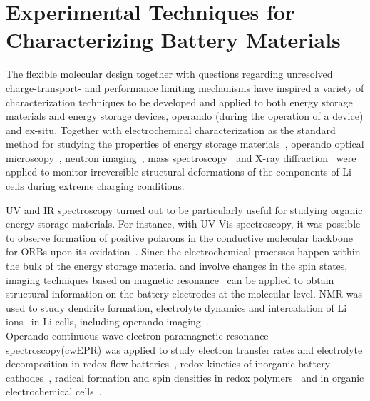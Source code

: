 \section{Experimental Techniques for Characterizing Battery Materials}
The flexible molecular design together with questions regarding unresolved charge-transport- and performance limiting mechanisms have inspired a variety of characterization techniques to be developed and applied to both energy storage materials and energy storage devices, operando (during the operation of a device) and ex-situ. Together with electrochemical characterization as the standard method for studying the properties of energy storage materials~\cite{Bard_book,IWASA2007,Zens2022}, operando optical microscopy~\cite{Merryweather2022}, neutron imaging~\cite{Ma2020}, mass spectroscopy~\cite{Fang_2021} and X-ray diffraction~\cite{Rhodes2012} were applied to monitor irreversible structural deformations of the components of Li cells during extreme charging conditions.\\

\par UV and IR spectroscopy turned out to be particularly useful for studying organic energy-storage materials. For instance, with UV-Vis spectroscopy, it was possible to observe formation of positive polarons in the conductive molecular backbone for ORBs upon its oxidation~\cite{Dmitrieva2018}.
Since the electrochemical processes happen within the bulk of the energy storage material and involve changes in the spin states, imaging techniques based on magnetic resonance~\cite{Niemoller2018,Meier2013,Li2019,Bittl2005} can be applied to obtain structural information on the battery electrodes at the molecular level. NMR was used to study dendrite formation, electrolyte dynamics and intercalation of Li ions~\cite{Kushida1980,Grosu2023a} in Li cells, including operando imaging~\cite{Shi2019}.\\ 

Operando continuous-wave electron paramagnetic resonance spectroscopy(cwEPR) was applied to study electron transfer rates and electrolyte decomposition in redox-flow batteries~\cite{zhao2021_jacs}, redox kinetics of inorganic battery cathodes~\cite{Niemoller2019}, radical formation and spin densities in redox polymers~\cite{Dmitrieva2018} and in organic electrochemical cells~\cite{huang2016_jpowersources,Kulikov2022,kanzaki2018_acsappmat}.\\

